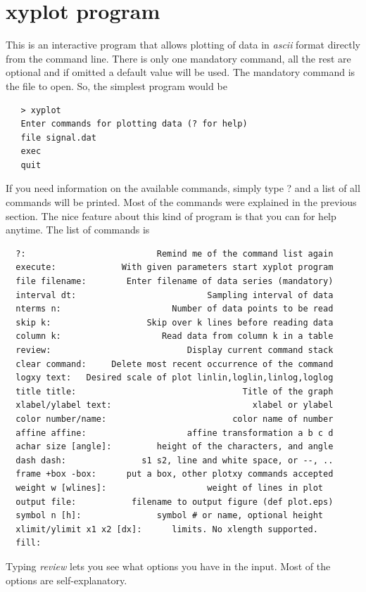 \documentclass{article}
\begin{document}
\section{xyplot program}
This is an interactive program that allows plotting of data in {\it ascii} format directly from the command line. There is only one mandatory command, all the rest are optional and if omitted a default value will be used. The mandatory command is the file to open. So, the simplest program would be
\begin{verbatim}
   > xyplot
   Enter commands for plotting data (? for help)
   file signal.dat
   exec
   quit
\end{verbatim}

If you need information on the available commands, simply type ? and a list of all commands will be printed. Most of the commands were explained in the previous section. The nice feature about this kind of program is that you can for help anytime. The list of commands is
\begin{verbatim}
  ?:                          Remind me of the command list again
  execute:             With given parameters start xyplot program
  file filename:        Enter filename of data series (mandatory)
  interval dt:                          Sampling interval of data
  nterms n:                      Number of data points to be read
  skip k:                   Skip over k lines before reading data
  column k:                    Read data from column k in a table
  review:                           Display current command stack
  clear command:     Delete most recent occurrence of the command
  logxy text:   Desired scale of plot linlin,loglin,linlog,loglog
  title title:                                 Title of the graph
  xlabel/ylabel text:                            xlabel or ylabel
  color number/name:                         color name of number
  affine affine:                    affine transformation a b c d
  achar size [angle]:         height of the characters, and angle
  dash dash:               s1 s2, line and white space, or --, ..
  frame +box -box:      put a box, other plotxy commands accepted
  weight w [wlines]:                    weight of lines in plot  
  output file:           filename to output figure (def plot.eps) 
  symbol n [h]:               symbol # or name, optional height  
  xlimit/ylimit x1 x2 [dx]:      limits. No xlength supported.   
  fill:   
\end{verbatim}
Typing {\it review} lets you see what options you have in the input. Most of the options are self-explanatory. 
\end{document}
